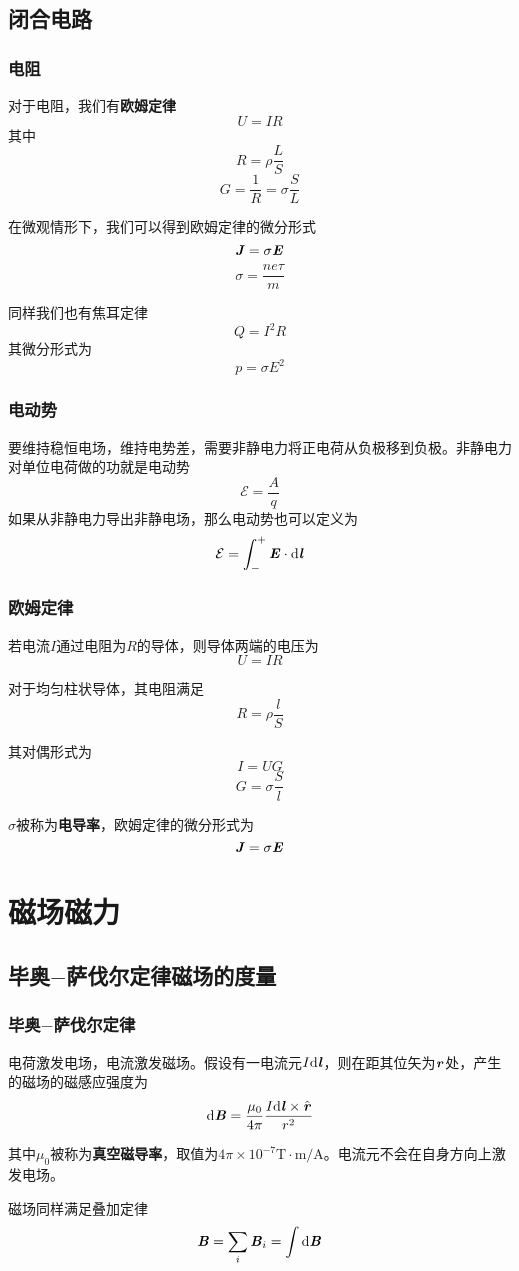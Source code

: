 \documentclass[UTF8,openany]{book}
\begin{document}
	\section{闭合电路}
	\subsection{电阻}
	\par 对于电阻，我们有\textbf{欧姆定律}
	$$U=IR$$
	其中
	$$R=\rho\frac{L}{S}$$
	$$G=\frac{1}{R}=\sigma\frac{S}{L}$$
	\par 在微观情形下，我们可以得到欧姆定律的微分形式
	$$\textbf{\textit{J}}=\sigma\textbf{\textit{E}}$$
	$$\sigma=\frac{ne\tau}{m}$$
	\par 同样我们也有焦耳定律
	$$Q=I^2R$$
	其微分形式为
	$$p=\sigma E^2$$
	\subsection{电动势}
	\par 要维持稳恒电场，维持电势差，需要非静电力将正电荷从负极移到负极。非静电力对单位电荷做的功就是电动势
	$$\mathcal{E}=\frac{A}{q}$$
	如果从非静电力导出非静电场，那么电动势也可以定义为
	$$\mathcal{E}=\int_{-}^{+}\textbf{\textit{E}}\cdot\mathrm{d}\textbf{\textit{l}}$$
	\subsection{欧姆定律}
	\par 若电流$I$通过电阻为$R$的导体，则导体两端的电压为
	$$U=IR$$
	\par 对于均匀柱状导体，其电阻满足
	\[
	R=\rho\frac{l}{S}	
	\]
	\par 其对偶形式为
	\[
	I=UG
	\]
	\[
	G=\sigma\frac{S}{l}	
	\]
	\par $\sigma$被称为\textbf{电导率}，欧姆定律的微分形式为
	\[
	\textbf{\textit{J}}=\sigma\textbf{\textit{E}}	
	\]
	\chapter{磁场\quad 磁力}
	\section{毕奥$-$萨伐尔定律\quad 磁场的度量\quad}
	\subsection{毕奥$-$萨伐尔定律}
	\par 电荷激发电场，电流激发磁场。假设有一电流元$I\mathrm{d}\textbf{\textit{l}}$，则在距其位矢为$\textbf{\textit{r}}$处，产生的磁场的磁感应强度为
	$$\mathrm{d}\textbf{\textit{B}}=\frac{\mu_0}{4\pi}\frac{I\mathrm{d}\textbf{\textit{l}}\times\hat{\textbf{\textit{r}}}}{r^2}$$
	\par 其中$\mu_0$被称为\textbf{真空磁导率}，取值为$4\pi\times10^{-7}\mathrm{T\cdot m/A}$。电流元不会在自身方向上激发电场。
	\par 磁场同样满足叠加定律
	$$\textbf{\textit{B}}=\sum_{i}\textbf{\textit{B}}_{i}=\int\mathrm{d}\textbf{\textit{B}}$$
\end{document}
